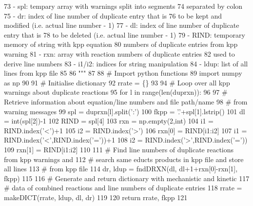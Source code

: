 \begin{DoxyCode}
73 \textcolor{stringliteral}{        - spl:      tempary array with warnings split into segments}
74 \textcolor{stringliteral}{                    separated by colon}
75 \textcolor{stringliteral}{        - dr:       index of line number of duplicate entry that is}
76 \textcolor{stringliteral}{                    to be kept and modified (i.e. actual line number - 1)}
77 \textcolor{stringliteral}{        - dl:       index of line number of duplicate entry that is}
78 \textcolor{stringliteral}{                    to be deleted (i.e. actual line number - 1)}
79 \textcolor{stringliteral}{        - RIND:     temporary memory of string with kpp equation}
80 \textcolor{stringliteral}{                    numbers of duplicate entries from kpp warning}
81 \textcolor{stringliteral}{        - rxn:      array with reaction numbers of duplicate entries}
82 \textcolor{stringliteral}{                    used to derive line numbers}
83 \textcolor{stringliteral}{        - i1/i2:    indices for string manipulation}
84 \textcolor{stringliteral}{        - ldup:     list of all lines from kpp file}
85 \textcolor{stringliteral}{}
86 \textcolor{stringliteral}{    """}
87 
88 \textcolor{comment}{# Import python functions}
89     \textcolor{keyword}{import} numpy \textcolor{keyword}{as} np
90 
91 \textcolor{comment}{# Initialise dictionary}
92     rrate  = \{\}
93 
94 \textcolor{comment}{# Loop over all kpp warnings about duplicate reactions}
95     \textcolor{keywordflow}{for} l \textcolor{keywordflow}{in} range(len(duprxn)):
96 
97 \textcolor{comment}{# Retrieve information about equation/line numbers and file path/name}
98 \textcolor{comment}{# from warning messages}
99         spl = duprxn[l].split(\textcolor{stringliteral}{':'})
100         fkpp = \textcolor{stringliteral}{'.'}+spl[1].lstrip()
101         dl = int(spl[2])-1
102         RIND = spl[4]
103         rxn = np.empty(2,int)
104         i1 = RIND.index(\textcolor{stringliteral}{'<'})+1
105         i2 = RIND.index(\textcolor{stringliteral}{'>'})
106         rxn[0] = RIND[i1:i2]
107         i1 = RIND.index(\textcolor{stringliteral}{'<'},RIND.index(\textcolor{stringliteral}{'='}))+1
108         i2 = RIND.index(\textcolor{stringliteral}{'>'},RIND.index(\textcolor{stringliteral}{'='}))
109         rxn[1] = RIND[i1:i2]
110 
111 \textcolor{comment}{# Find line numbers of duplicate reactions from kpp warnings and}
112 \textcolor{comment}{# search same educts products in kpp file and store all lines}
113 \textcolor{comment}{# from kpp file}
114         dr, ldup = fndDRXN(dl, dl+1+rxn[0]-rxn[1], fkpp)
115 
116 \textcolor{comment}{# Generate and return dictionary with mechanistic and kinetic}
117 \textcolor{comment}{# data of combined reactions and line numbers of duplicate entries}
118         rrate = makeDICT(rrate, ldup, dl, dr)
119 
120     \textcolor{keywordflow}{return} rrate, fkpp
121 
\end{DoxyCode}
